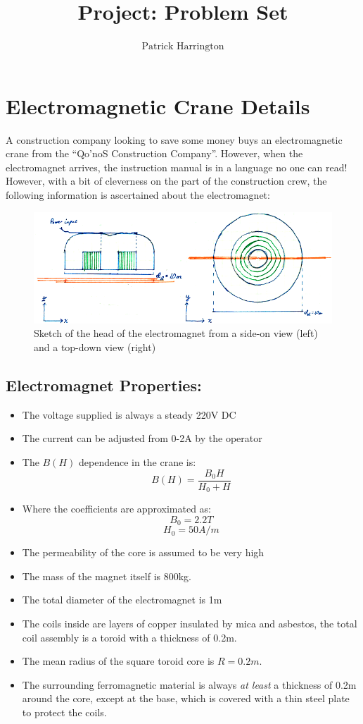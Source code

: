 \documentclass{./cls/hw}
\title{Project: Problem Set}
\author{$\boxed{\text{Patrick Harrington}}$}
\begin{document}
\maketitle
\section*{Electromagnetic Crane Details}
A construction company looking to save some money buys an
electromagnetic crane from the ``Qo'noS Construction Company''. However, when the electromagnet arrives, the
instruction manual is in a language no one can read! However, with a bit of
cleverness on the part of the construction crew, the following information is
ascertained about the electromagnet:

\begin{figure}[h!]
  \centering
  \includegraphics[scale=0.9]{electromagnet.png}
  \caption{Sketch of the head of the electromagnet from a side-on view (left)
  and a top-down view (right)}
\end{figure}

\subsection*{Electromagnet Properties:}
\begin{itemize}
  \item The voltage supplied is always a steady 220V DC
  \item The current can be adjusted from 0-2A by the operator
  \item The ${B(H)}$ dependence in the crane is:
  \[ B(H)=\frac{B_0 H}{H_0 + H} \]
  \item Where the coefficients are approximated as:
    \[B_0=2.2 T\]
    \[H_0=50 A/m\]
  \item The permeability of the core is assumed to be very high
  \item The mass of the magnet itself is 800kg.
  \item The total diameter of the electromagnet is 1m
  \item The coils inside are layers of copper insulated by mica and asbestos,
    the total coil assembly is a toroid with a thickness of 0.2m.
  \item The mean radius of the square toroid core is $R=0.2m$.
\item The surrounding ferromagnetic material is always \emph{at least} a thickness of
    0.2m around the core, except at the base, which is covered with a thin
    steel plate to protect the coils. 
\end{itemize}
\end{document}
